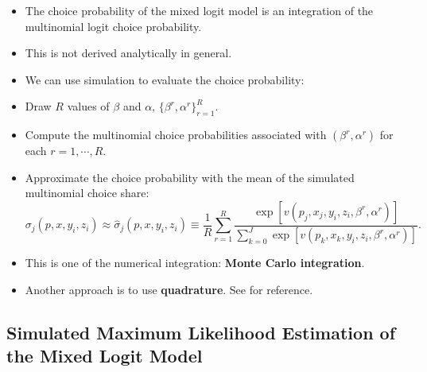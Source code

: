 \documentclass[
]{book}
\providecommand{\tightlist}{%
  \setlength{\itemsep}{0pt}\setlength{\parskip}{0pt}}
\begin{document}
\begin{itemize}
\tightlist
\item
  The choice probability of the mixed logit model is an integration of the multinomial logit choice probability.
\item
  This is not derived analytically in general.
\item
  We can use simulation to evaluate the choice probability:
\item
  Draw \(R\) values of \(\beta\) and \(\alpha\), \(\{\beta^r, \alpha^r \}_{r = 1}^R\).
\item
  Compute the multinomial choice probabilities associated with \((\beta^r, \alpha^r)\) for each \(r = 1, \cdots, R\).
\item
  Approximate the choice probability with the mean of the simulated multinomial choice share:
  \begin{equation}
  \sigma_{j}(p, x, y_i, z_i) \approx \hat{\sigma}_{j}(p, x, y_i, z_i) \equiv \frac{1}{R} \sum_{r = 1}^R  \frac{\exp[v(p_j, x_j, y_i, z_i, \beta^r, \alpha^r)]}{\sum_{k = 0}^J \exp[v(p_k, x_k, y_i, z_i, \beta^r, \alpha^r)]}.
  \end{equation}
\item
  This is one of the numerical integration: \textbf{Monte Carlo integration}.
\item
  Another approach is to use \textbf{quadrature}. See \citet{Judd1998} for reference.
\end{itemize}

\hypertarget{simulated-maximum-likelihood-estimation-of-the-mixed-logit-model-1}{%
\subsection{Simulated Maximum Likelihood Estimation of the Mixed Logit Model}\label{simulated-maximum-likelihood-estimation-of-the-mixed-logit-model-1}}
\end{document}
